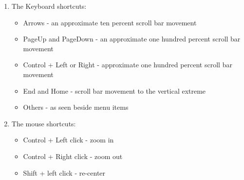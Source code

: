 \begin{enumerate}
\item The Keyboard shortcuts: 

\begin{itemize}
\item Arrows - an approximate ten percent scroll bar movement
\item PageUp and PageDown - an approximate one hundred percent scroll bar movement 
\item Control + Left or Right - approximate one hundred percent scroll bar movement 
\item End and Home - scroll bar movement to the vertical extreme 
\item Others - as seen beside menu items
\end{itemize}

\item The mouse shortcuts: 

\begin{itemize}
\item Control + Left click - zoom in 
\item Control + Right click - zoom out
\item Shift + left click - re-center
\end{itemize}
\end{enumerate}
 

